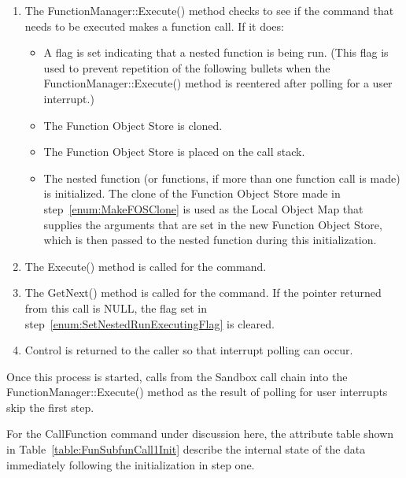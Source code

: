 \begin{enumerate}
\item The FunctionManager::Execute() method checks to see if the command that needs to be executed
makes a function call.  If it does:
\begin{itemize}
\item\label{enum:SetNestedRunExecutingFlag}  A flag is set indicating that a nested function is
being run. (This flag is used to prevent repetition of the following bullets when the
FunctionManager::Execute() method is reentered after polling for a user interrupt.)
\item\label{enum:MakeFOSClone} The Function Object Store is cloned.
\item The Function Object Store is placed on the call stack.
\item The nested function (or functions, if more than one function call is made) is initialized. 
The clone of the Function Object Store made in step~\ref{enum:MakeFOSClone} is used as the Local 
Object Map that supplies the arguments that are set in the new Function Object Store, which is then
passed to the nested function during this initialization.
\end{itemize}
\item The Execute() method is called for the command.
\item The GetNext() method is called for the command.  If the pointer returned from this call is
NULL, the flag set in step~\ref{enum:SetNestedRunExecutingFlag} is cleared.
\item Control is returned to the caller so that interrupt polling can occur.
\end{enumerate}

\noindent Once this process is started, calls from the Sandbox call chain into the
FunctionManager::Execute() method as the result of polling for user interrupts skip the first step.

For the CallFunction command under discussion here, the attribute table shown in
Table~\ref{table:FunSubfunCall1Init} describe the internal state of the data immediately following
the initialization in step one.

